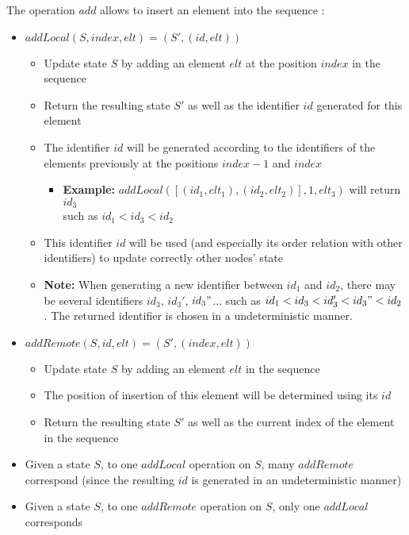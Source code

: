 \documentclass[a4paper]{article}
\begin{document}
The operation $add$ allows to insert an element into the sequence :
\begin{itemize}
  \item $addLocal(S, index, elt) = (S', (id, elt))$
  \begin{itemize}
    \item Update state $S$ by adding an element $elt$ at the position $index$ in the sequence
    \item Return the resulting state $S'$ as well as the identifier $id$ generated for this element
    \item The identifier $id$ will be generated according to the identifiers of the elements previously at the positions $index-1$ and $index$
    \begin{itemize}
      \item \textbf{Example: } $addLocal([(id_1, elt_1), (id_2, elt_2)], 1, elt_3)$ will return $id_3$\\ such as $id_1 < id_3 < id_2$
    \end{itemize}
    \item This identifier $id$ will be used (and especially its order relation with other identifiers) to update correctly other nodes' state
    \item \textbf{Note: } When generating a new identifier between $id_1$ and $id_2$,
      there may be several identifiers $id_3$, $id_3'$, $id_3"$... such as
      $id_1 < id_3 < id_3' < id_3" < id_2$. The returned identifier is chosen in a undeterministic manner.
  \end{itemize}
  \item $addRemote(S, id, elt) = (S', (index, elt))$
  \begin{itemize}
    \item Update state $S$ by adding an element $elt$ in the sequence
    \item The position of insertion of this element will be determined using its $id$
    \item Return the resulting state $S'$ as well as the current index of the element in the sequence
  \end{itemize}
  \item Given a state $S$, to one $addLocal$ operation on $S$, many $addRemote$ correspond
    (since the resulting $id$ is generated in an undeterministic manner)
  \item Given a state $S$, to one $addRemote$ operation on $S$, only one $addLocal$ corresponds
\end{itemize}
\end{document}
